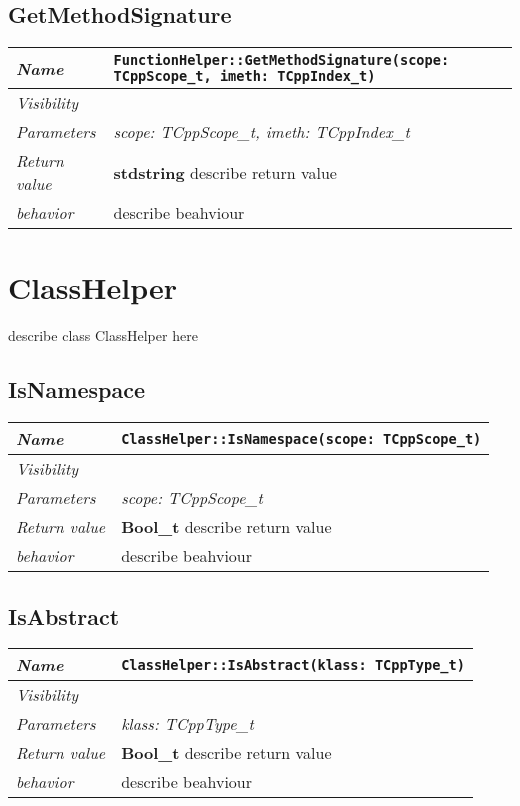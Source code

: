  \section{GetMethodSignature}
\begin{longtable}{p{3cm} @{\hskip 1cm} p{12cm}}
 \hline
\textit{Name} & \texttt{FunctionHelper::GetMethodSignature(scope: TCppScope_t, imeth: TCppIndex_t)}\\
\hline
 \textit{Visibility} & \\
\hline
\textit{Parameters} & \textit{scope: TCppScope_t, imeth: TCppIndex_t}\\
\hline
\textit{Return value} & \textbf{ stdstring} describe return value\\
  \hline
 \textit{behavior} & describe beahviour \\
\hline
\end{longtable} \pagebreak
 \chapter{ClassHelper}
describe class ClassHelper here
\section{IsNamespace}
\begin{longtable}{p{3cm} @{\hskip 1cm} p{12cm}}
 \hline
\textit{Name} & \texttt{ClassHelper::IsNamespace(scope: TCppScope_t)}\\
\hline
 \textit{Visibility} & \\
\hline
\textit{Parameters} & \textit{scope: TCppScope_t}\\
\hline
\textit{Return value} & \textbf{ Bool_t} describe return value\\
  \hline
 \textit{behavior} & describe beahviour \\
\hline
\end{longtable} \pagebreak
 \section{IsAbstract}
\begin{longtable}{p{3cm} @{\hskip 1cm} p{12cm}}
 \hline
\textit{Name} & \texttt{ClassHelper::IsAbstract(klass: TCppType_t)}\\
\hline
 \textit{Visibility} & \\
\hline
\textit{Parameters} & \textit{klass: TCppType_t}\\
\hline
\textit{Return value} & \textbf{ Bool_t} describe return value\\
  \hline
 \textit{behavior} & describe beahviour \\
\hline
\end{longtable} \pagebreak
